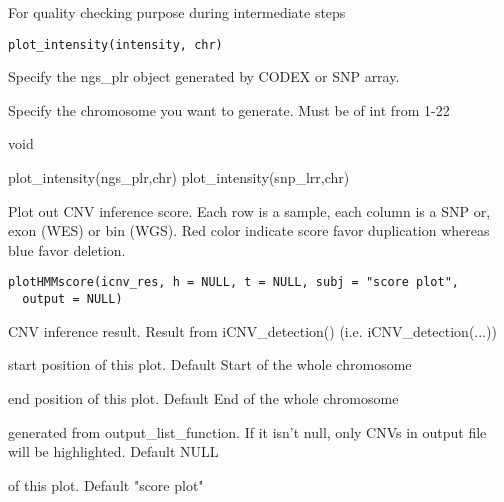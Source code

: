 \documentclass[a4paper]{book}
\begin{document}
%
\begin{Description}\relax
For quality checking purpose during intermediate steps
\end{Description}
%
\begin{Usage}
\begin{verbatim}
plot_intensity(intensity, chr)
\end{verbatim}
\end{Usage}
%
\begin{Arguments}
\begin{ldescription}
\item[\code{intensity}] Specify the ngs\_plr object generated by CODEX or SNP array.

\item[\code{chr}] Specify the chromosome you want to generate. Must be of int from 1-22
\end{ldescription}
\end{Arguments}
%
\begin{Value}
void
\end{Value}
%
\begin{Examples}
\begin{ExampleCode}
plot_intensity(ngs_plr,chr)
plot_intensity(snp_lrr,chr)
\end{ExampleCode}
\end{Examples}
%
\begin{Description}\relax
Plot out CNV inference score. Each row is a sample, each column is a SNP or, exon (WES) or bin (WGS). Red color indicate score
favor duplication whereas blue favor deletion.
\end{Description}
%
\begin{Usage}
\begin{verbatim}
plotHMMscore(icnv_res, h = NULL, t = NULL, subj = "score plot",
  output = NULL)
\end{verbatim}
\end{Usage}
%
\begin{Arguments}
\begin{ldescription}
\item[\code{icnv\_res}] CNV inference result. Result from iCNV\_detection() (i.e. iCNV\_detection(...))

\item[\code{h}] start position of this plot. Default Start of the whole chromosome

\item[\code{t}] end position of this plot. Default End of the whole chromosome

\item[\code{output}] generated from output\_list\_function. If it isn't null, only CNVs in output file will be highlighted. Default NULL

\item[\code{title}] of this plot. Default "score plot"
\end{ldescription}
\end{Arguments}
\end{document}
